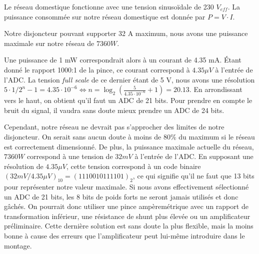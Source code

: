 \documentclass{../../template/tp}
\begin{document}
{
	Le réseau domestique fonctionne avec une tension sinusoïdale de 230 $V_{eff}$.
	La puissance consommée sur notre réseau domestique est donnée par $P = V \cdot I$.

	Notre disjoncteur pouvant supporter 32 A maximum, nous avons une puissance maximale sur notre réseau de $7360 W$.

	Une puissance de 1 mW correspondrait alors à un courant de 4.35 mA. Étant donné le rapport 1000:1 de la pince, ce courant correspond à $4.35\mu V$ à l'entrée de l'ADC.
	La tension \textit{full scale} de ce dernier étant de 5 V, nous avons une résolution $5 \cdot 1/2^n-1 = 4.35 \cdot 10^{-6} \Leftrightarrow  n = \log_2(\frac{5}{4.35 \cdot 10^{-6}}+1) = 20.13$. En arrondissant vers le haut, on obtient qu'il faut un ADC de 21 bits. Pour prendre en compte le bruit du signal, il vaudra sans doute mieux prendre un ADC de 24 bits.

	Cependant, notre réseau ne devrait pas s'approcher des limites de notre disjoncteur. On serait sans aucun doute à moins de 80\% du maximum si le réseau est correctement dimensionné.
	De plus, la puissance maximale actuelle du réseau, $7360 W$ correspond à une tension de $32 mV$ à l'entrée de l'ADC. En supposant une résolution de $4.35\mu V$, cette tension correspond à un code binaire $(32 mV/4.35\mu V)_{10} = (1110010111101)_2$, ce qui signifie qu'il ne faut que 13 bits pour représenter notre valeur maximale. Si nous avons effectivement sélectionné un ADC de 21 bits, les 8 bits de poids forts ne seront jamais utilisés et donc gâchés.
	On pourrait donc utiliser une pince ampèremétrique avec un rapport de transformation inférieur, une résistance de shunt plus élevée ou un amplificateur préliminaire. Cette dernière solution est sans doute la plus flexible, mais la moins bonne à cause des erreurs que l'amplificateur peut lui-même introduire dans le montage.
}
\end{document}
